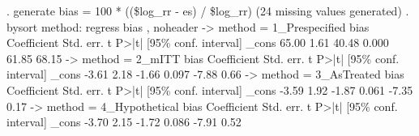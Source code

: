 . generate bias = 100 * ((\$log_rr - es) / \$log_rr)
(24 missing values generated)
{\smallskip}
. bysort method: regress bias , noheader
{\smallskip}
-> method = 1_Prespecified
        bias {\VBAR} Coefficient  Std. err.      t    P>|t|     [95\% conf. interval]
       _cons {\VBAR}      65.00       1.61    40.48   0.000        61.85       68.15
{\smallskip}
-> method = 2_mITT
        bias {\VBAR} Coefficient  Std. err.      t    P>|t|     [95\% conf. interval]
       _cons {\VBAR}      -3.61       2.18    -1.66   0.097        -7.88        0.66
{\smallskip}
-> method = 3_AsTreated
        bias {\VBAR} Coefficient  Std. err.      t    P>|t|     [95\% conf. interval]
       _cons {\VBAR}      -3.59       1.92    -1.87   0.061        -7.35        0.17
{\smallskip}
-> method = 4_Hypothetical
        bias {\VBAR} Coefficient  Std. err.      t    P>|t|     [95\% conf. interval]
       _cons {\VBAR}      -3.70       2.15    -1.72   0.086        -7.91        0.52
